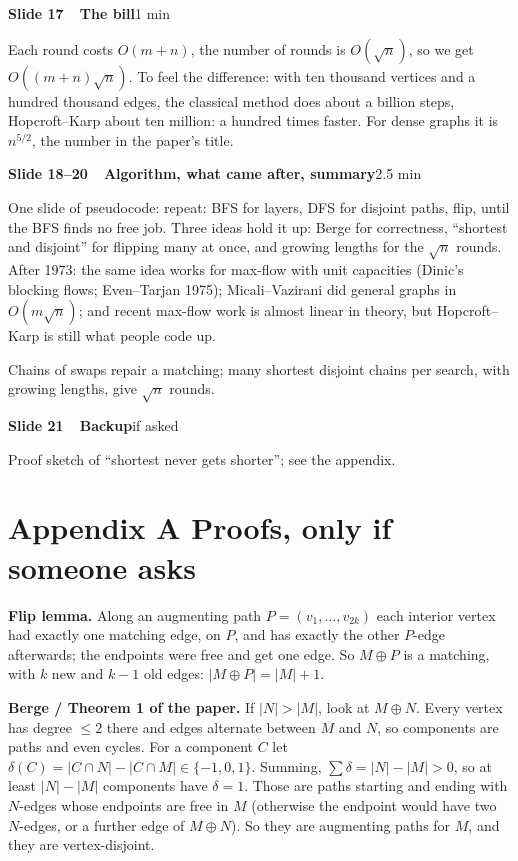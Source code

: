 \documentclass[11pt,a4paper]{article}
\newcommand{\slidehead}[3]{%
  \Needspace{9\baselineskip}\vspace{4pt}\noindent\colorbox{hkblue!12}{\parbox{\dimexpr\linewidth-2\fboxsep}{%
  \textbf{\color{hkblue}Slide #1\ \ #2}\hfill{\small\color{hkgrey}#3}}}\par\vspace{2pt}}
\begin{document}
\slidehead{17}{The bill}{1 min}
\begin{say}
Each round costs $O(m+n)$, the number of rounds is $O(\sqrt n)$, so we get $O((m+n)\sqrt n)$. To feel the difference: with ten thousand vertices and a hundred thousand edges, the classical method does about a billion steps, Hopcroft--Karp about ten million: a hundred times faster. For dense graphs it is $n^{5/2}$, the number in the paper's title.
\end{say}

\slidehead{18--20}{Algorithm, what came after, summary}{2.5 min}
\begin{say}
One slide of pseudocode: repeat: BFS for layers, DFS for disjoint paths, flip, until the BFS finds no free job. Three ideas hold it up: Berge for correctness, ``shortest and disjoint'' for flipping many at once, and growing lengths for the $\sqrt n$ rounds.
After 1973: the same idea works for max-flow with unit capacities (Dinic's blocking flows; Even--Tarjan 1975); Micali--Vazirani did general graphs in $O(m\sqrt n)$; and recent max-flow work is almost linear in theory, but Hopcroft--Karp is still what people code up.
\end{say}
\begin{key}Chains of swaps repair a matching; many shortest disjoint chains per search, with growing lengths, give $\sqrt n$ rounds.\end{key}

\slidehead{21}{Backup}{if asked}
Proof sketch of ``shortest never gets shorter''; see the appendix.

\section*{Appendix A \quad Proofs, only if someone asks}

\textbf{Flip lemma.} Along an augmenting path $P=(v_1,\dots,v_{2k})$ each interior vertex had exactly one matching edge, on $P$, and has exactly the other $P$-edge afterwards; the endpoints were free and get one edge. So $M\oplus P$ is a matching, with $k$ new and $k-1$ old edges: $|M\oplus P|=|M|+1$.

\textbf{Berge / Theorem 1 of the paper.} If $|N|>|M|$, look at $M\oplus N$. Every vertex has degree $\le2$ there and edges alternate between $M$ and $N$, so components are paths and even cycles. For a component $C$ let $\delta(C)=|C\cap N|-|C\cap M|\in\{-1,0,1\}$. Summing, $\sum\delta=|N|-|M|>0$, so at least $|N|-|M|$ components have $\delta=1$. Those are paths starting and ending with $N$-edges whose endpoints are free in $M$ (otherwise the endpoint would have two $N$-edges, or a further edge of $M\oplus N$). So they are augmenting paths for $M$, and they are vertex-disjoint.
\end{document}
